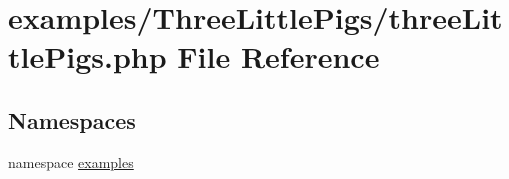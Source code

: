 \hypertarget{three_little_pigs_8php}{
\section{examples/ThreeLittlePigs/threeLittlePigs.php File Reference}
\label{three_little_pigs_8php}
}
\subsection*{Namespaces}
\begin{CompactItemize}
\item 
namespace \hyperlink{namespaceexamples}{examples}
\end{CompactItemize}
